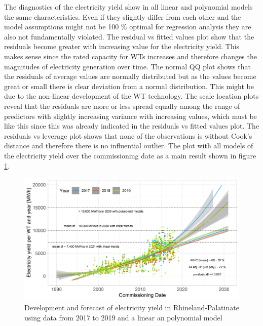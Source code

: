 \documentclass[a4paper,11pt]{article}
\begin{document}
The diagnostics of the electricity yield show in all linear and polynomial models the same characteristics. Even if they slightly differ from each other and the model assumptions might not be 100 \% optimal for regression analysis they are also not fundamentally violated. The residual vs fitted values plot show that the residuals become greater with increasing value for the electricity yield. This makes sense since the rated capacity for WTs increases and therefore changes the magnitudes of electricity generation over time. The normal QQ plot shows that the residuals of average values are normally distributed but as the values become great or small there is clear deviation from a normal distribution. This might be due to the non-linear development of the WT technology. The scale location plots reveal that the residuals are more or less spread equally among the range of predictors with slightly increasing variance with increasing values, which must be like this since this was already indicated in the residuals vs fitted values plot. The residuals vs leverage plot shows that none of the observations is without Cook's distance and therefore there is no influential outlier. The plot with all models of the electricity yield over the commissioning date as a main result shown in figure \ref{fig:electricityyield}.
\begin{figure}

{\centering \includegraphics[width=1\linewidth]{data/Amprion/results_of_analysis/electricity_yield_2017-2019} 

}

\caption{Development and forecast of electricity yield in Rhineland-Palatinate using data from 2017 to 2019 and a linear an polynomial model}\label{fig:electricityyield}
\end{figure}
\end{document}
